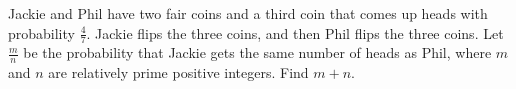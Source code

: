 Jackie and Phil have two fair coins and a third coin that comes up heads with probability $ \frac47$. Jackie flips the three coins, and then Phil flips the three coins. Let $ \frac{m}{n}$ be the probability that Jackie gets the same number of heads as Phil, where $ m$ and $ n$ are relatively prime positive integers. Find $ m + n$.